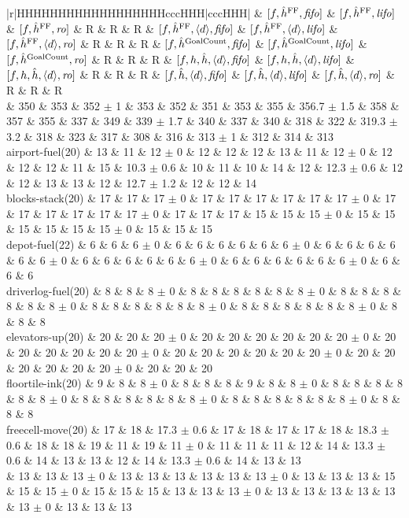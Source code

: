\begin{center}
\begin{tabular}{|r|HHHHHHHHHHHHHHHHHHcccHHH|cccHHH|}
 & $[f,\hat{h}^{\text{FF}},{\text{\textit{fifo}}}]$ & $[f,\hat{h}^{\text{FF}},{\text{\textit{lifo}}}]$ & $[f,\hat{h}^{\text{FF}},{\text{\textit{ro}}}]$ & R & R & R & $[f,\hat{h}^{\text{FF}},{\left<d\right>},{\text{\textit{fifo}}}]$ & $[f,\hat{h}^{\text{FF}},{\left<d\right>},{\text{\textit{lifo}}}]$ & $[f,\hat{h}^{\text{FF}},{\left<d\right>},{\text{\textit{ro}}}]$ & R & R & R & $[f,\hat{h}^{\text{GoalCount}},{\text{\textit{fifo}}}]$ & $[f,\hat{h}^{\text{GoalCount}},{\text{\textit{lifo}}}]$ & $[f,\hat{h}^{\text{GoalCount}},{\text{\textit{ro}}}]$ & R & R & R & $[f,h,\hat{h},{\left<d\right>},{\text{\textit{fifo}}}]$ & $[f,h,\hat{h},{\left<d\right>},{\text{\textit{lifo}}}]$ & $[f,h,\hat{h},{\left<d\right>},{\text{\textit{ro}}}]$ & R & R & R & $[f,\hat{h},{\left<d\right>},{\text{\textit{fifo}}}]$ & $[f,\hat{h},{\left<d\right>},{\text{\textit{lifo}}}]$ & $[f,\hat{h},{\left<d\right>},{\text{\textit{ro}}}]$ & R & R & R\\
\hline
 & 350 & 353 & 352 $\pm$ 1 & 353 & 352 & 351 & 353 & 355 & 356.7 $\pm$ 1.5 & 358 & 357 & 355 & 337 & 349 & 339 $\pm$ 1.7 & 340 & 337 & 340 & 318 & 322 & 319.3 $\pm$ 3.2 & 318 & 323 & 317 & 308 & 316 & 313 $\pm$ 1 & 312 & 314 & 313\\
\hline
airport-fuel(20) & 13 & 11 & 12 $\pm$ 0 & 12 & 12 & 12 & 13 & 11 & 12 $\pm$ 0 & 12 & 12 & 12 & 11 & 15 & 10.3 $\pm$ 0.6 & 10 & 11 & 10 & 14 & 12 & 12.3 $\pm$ 0.6 & 12 & 12 & 13 & 13 & 12 & 12.7 $\pm$ 1.2 & 12 & 12 & 14\\
blocks-stack(20) & 17 & 17 & 17 $\pm$ 0 & 17 & 17 & 17 & 17 & 17 & 17 $\pm$ 0 & 17 & 17 & 17 & 17 & 17 & 17 $\pm$ 0 & 17 & 17 & 17 & 15 & 15 & 15 $\pm$ 0 & 15 & 15 & 15 & 15 & 15 & 15 $\pm$ 0 & 15 & 15 & 15\\
depot-fuel(22) & 6 & 6 & 6 $\pm$ 0 & 6 & 6 & 6 & 6 & 6 & 6 $\pm$ 0 & 6 & 6 & 6 & 6 & 6 & 6 $\pm$ 0 & 6 & 6 & 6 & 6 & 6 & 6 $\pm$ 0 & 6 & 6 & 6 & 6 & 6 & 6 $\pm$ 0 & 6 & 6 & 6\\
driverlog-fuel(20) & 8 & 8 & 8 $\pm$ 0 & 8 & 8 & 8 & 8 & 8 & 8 $\pm$ 0 & 8 & 8 & 8 & 8 & 8 & 8 $\pm$ 0 & 8 & 8 & 8 & 8 & 8 & 8 $\pm$ 0 & 8 & 8 & 8 & 8 & 8 & 8 $\pm$ 0 & 8 & 8 & 8\\
elevators-up(20) & 20 & 20 & 20 $\pm$ 0 & 20 & 20 & 20 & 20 & 20 & 20 $\pm$ 0 & 20 & 20 & 20 & 20 & 20 & 20 $\pm$ 0 & 20 & 20 & 20 & 20 & 20 & 20 $\pm$ 0 & 20 & 20 & 20 & 20 & 20 & 20 $\pm$ 0 & 20 & 20 & 20\\
floortile-ink(20) & 9 & 8 & 8 $\pm$ 0 & 8 & 8 & 8 & 9 & 8 & 8 $\pm$ 0 & 8 & 8 & 8 & 8 & 8 & 8 $\pm$ 0 & 8 & 8 & 8 & 8 & 8 & 8 $\pm$ 0 & 8 & 8 & 8 & 8 & 8 & 8 $\pm$ 0 & 8 & 8 & 8\\
freecell-move(20) & 17 & 18 & 17.3 $\pm$ 0.6 & 17 & 18 & 17 & 17 & 18 & 18.3 $\pm$ 0.6 & 18 & 18 & 19 & 11 & 19 & 11 $\pm$ 0 & 11 & 11 & 11 & 12 & 14 & 13.3 $\pm$ 0.6 & 14 & 13 & 13 & 12 & 14 & 13.3 $\pm$ 0.6 & 14 & 13 & 13\\
 & 13 & 13 & 13 $\pm$ 0 & 13 & 13 & 13 & 13 & 13 & 13 $\pm$ 0 & 13 & 13 & 13 & 15 & 15 & 15 $\pm$ 0 & 15 & 15 & 15 & 13 & 13 & 13 $\pm$ 0 & 13 & 13 & 13 & 13 & 13 & 13 $\pm$ 0 & 13 & 13 & 13\\

\end{tabular}
\end{center}
